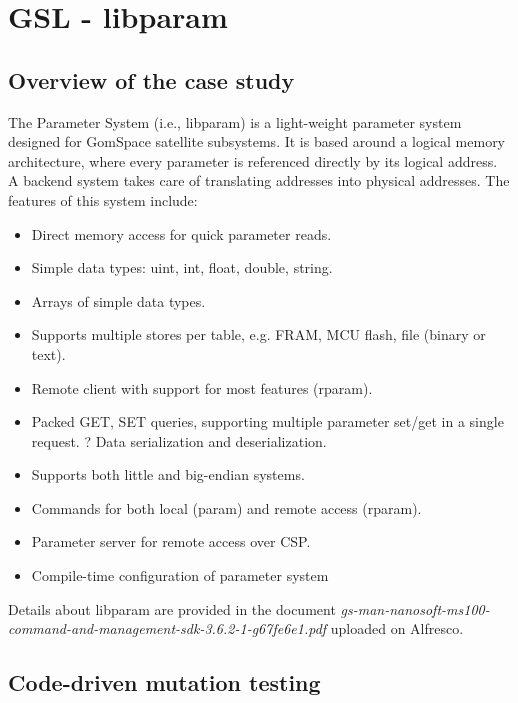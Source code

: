 


\section{GSL - libparam}
\label{sec:caseStudies:GSL:libparam}

\subsection{Overview of the case study}

The Parameter System (i.e., libparam) is a light-weight parameter system designed for GomSpace satellite subsystems. It is based around a logical memory architecture, where every parameter is referenced directly by its logical address. A backend system takes care of translating addresses into physical addresses.
The features of this system include:
\begin{itemize}
\item Direct memory access for quick parameter reads.
\item Simple data types: uint, int, float, double, string.
\item Arrays of simple data types.
\item Supports multiple stores per table, e.g. FRAM, MCU flash, file (binary or text).
\item Remote client with support for most features (rparam).
\item Packed GET, SET queries, supporting multiple parameter set/get in a single request. ? Data serialization and deserialization.
\item Supports both little and big-endian systems.
\item Commands for both local (param) and remote access (rparam).
\item Parameter server for remote access over CSP.
\item Compile-time configuration of parameter system
\end{itemize}

Details about libparam are provided in the document \emph{gs-man-nanosoft-ms100-command-and-management-sdk-3.6.2-1-g67fe6e1.pdf} uploaded on Alfresco.

\subsection{Code-driven mutation testing}

